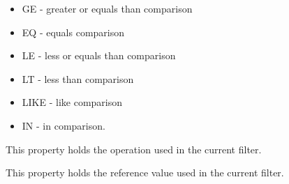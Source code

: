 \documentclass[letterpaper,10pt,english]{sphinxmanual}
\begin{document}
\begin{fulllineitems}
\begin{fulllineitems}
\begin{itemize}
\item {} 
GE - greater or equals than comparison

\item {} 
EQ - equals comparison

\item {} 
LE - less or equals than comparison

\item {} 
LT - less than comparison

\item {} 
LIKE - like comparison

\item {} 
IN - in comparison.

\end{itemize}

\end{fulllineitems}


\begin{fulllineitems}
\label{features/mvc:fantastico.mvc.models.model_filter.ModelFilter.operation}
This property holds the operation used in the current filter.

\end{fulllineitems}


\begin{fulllineitems}
\label{features/mvc:fantastico.mvc.models.model_filter.ModelFilter.ref_value}
This property holds the reference value used in the current filter.

\end{fulllineitems}


\end{fulllineitems}

\end{document}
